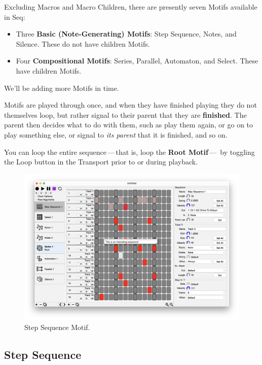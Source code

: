 \documentclass[twoside,10pt]{article}
\begin{document}
Excluding Macros and Macro Children, there are presently seven Motifs available in Seq:

\begin{itemize}
\item Three {\bf Basic (Note-Generating) Motifs}: Step Sequence, Notes, and Silence.  These do not have children Motifs.
\item Four {\bf Compositional Motifs}: Series, Parallel, Automaton, and Select.  These have children Motifs.
\end{itemize}

We'll be adding more Motifs in time.

\vspace{1em}

Motifs are played through once, and when they have finished playing they do not themselves loop, but rather signal to their parent that they are {\bf finished}.  The parent then decides what to do with them, such as play them again, or go on to play something else, or signal to {\it its parent} that it is finished, and so on.

You can loop the entire sequence\,---\,that is, loop the {\bf Root Motif}\,---\, by toggling the Loop button in the Transport prior to or during playback.

\clearpage

\begin{figure}[t]
\centering
\includegraphics[width=6.5in]{StepSequence}
\vspace{-2em}
\caption{Step Sequence Motif.}
\label{stepsequence}
\end{figure}

\subsection{Step Sequence}
\end{document}
